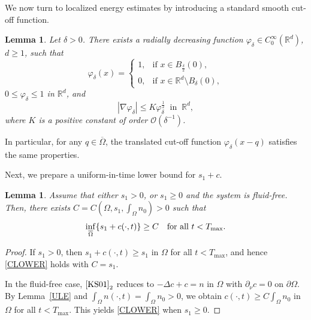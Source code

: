 \documentclass{amsart}
\newtheorem{lemma}[defn]{Lemma}
\numberwithin{equation}{section}
\begin{document}
 
We now turn to localized energy estimates by introducing a standard smooth cut-off function.

\begin{lemma}\label{LEMSTEST}
Let $\delta >0$. There exists a radially decreasing function 
$\varphi_{\delta} \in C_{0}^{\infty}(\mathbb{R}^d)$, $d\ge1$,  such that 
	\[
	\varphi_{\delta}(x) = 
	\begin{cases}
		1, & \text{if } x\in B_{\frac{\delta}{2}}(0), \\
		0, & \text{if } x\in \mathbb{R}^d \setminus B_{\delta}(0),
	\end{cases}
	\]
	$0\leq \varphi_{\delta} \leq 1 $    in $\mathbb{R}^d$,
	and 
	\[
 |\nabla \varphi_{\delta}| \leq K \varphi_{\delta}^{\frac{1}{2}} \ \text{ in } \ \mathbb{R}^d,
	\]
	where $K$ is a positive constant of order $\mathcal{O}(\delta^{-1})$.
\end{lemma}

In particular, for any $q \in \overline{\Omega}$, the translated cut-off function $\varphi_{\delta}(x-q)$ satisfies the same properties. 

Next, we prepare a uniform-in-time lower bound for $s_{1}+c$.

\begin{lemma}
Assume that either $s_{1}>0$, or $s_{1}\ge0$ and the system is fluid-free. Then, there exists $C=C(\Omega, s_1, \int_{\Omega}n_0)>0$ such that 
 \begin{equation}\label{CLOWER}
\inf_{\overline{\Omega}}\{s_{1}+c(\cdot,t)\}\ge C\quad\mbox{for all }t<T_{\rm max}.
 \end{equation}
\end{lemma}


\begin{proof}
If $s_1>0$, then $s_1+c(\cdot,t)\ge s_1$ in $\Omega$ for all $t<T_{\max}$, and hence \eqref{CLOWER} holds with $C=s_1$.

In the fluid-free case, $\eqref{KS01}_2$ reduces to $-\Delta c + c = n$ in $\Omega$ with $\partial_\nu c=0$ on $\partial\Omega$.
By Lemma~\ref{ULE} and $\int_\Omega n(\cdot,t)=\int_\Omega n_0>0$, we obtain
$c(\cdot,t)\ge C\int_\Omega n_0$ in $\Omega$ for all $t<T_{\max}$.
This yields \eqref{CLOWER} when $s_1\ge0$.
\end{proof}
\end{document}
